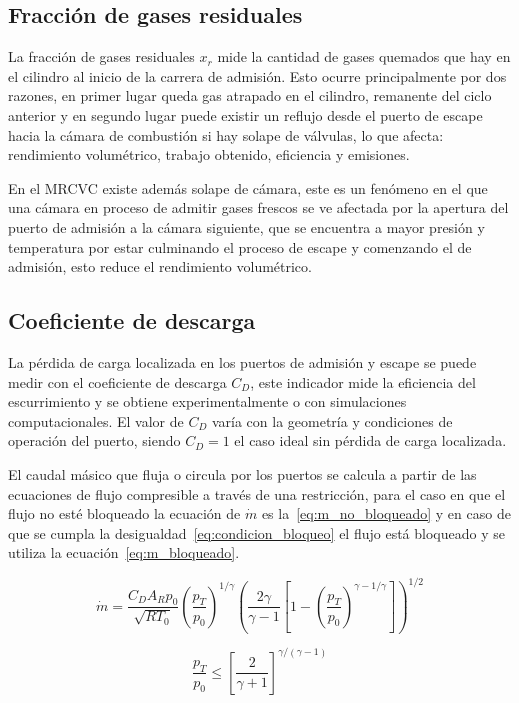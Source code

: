 \subsection{Fracción de gases residuales}
%
La fracción de gases residuales $x_r$ mide la cantidad de gases quemados que hay
en el cilindro al inicio de la carrera de admisión.
%
Esto ocurre principalmente por dos razones, en primer lugar queda gas atrapado
en el cilindro, remanente del ciclo anterior y en segundo lugar puede existir un
reflujo desde el puerto de escape hacia la cámara de combustión si hay solape de
válvulas, lo que afecta: rendimiento volumétrico, trabajo obtenido, eficiencia y
emisiones.

En el MRCVC existe además solape de cámara, este es un fenómeno en el que una
cámara en proceso de admitir gases frescos se ve afectada por la apertura del
puerto de admisión a la cámara siguiente, que se encuentra a mayor presión y
temperatura por estar culminando el proceso de escape y comenzando el de
admisión, esto reduce el rendimiento volumétrico.
%
%
\subsection{Coeficiente de descarga}
%
La pérdida de carga localizada en los puertos de admisión y escape se puede
medir con el coeficiente de descarga $C_{D}$, este indicador mide la eficiencia
del escurrimiento y se obtiene experimentalmente o con simulaciones
computacionales.
%
El valor de $C_{D}$ varía con la geometría y condiciones de operación del
puerto, siendo $C_{D}=1$ el caso ideal sin pérdida de carga localizada.

El caudal másico que fluja o circula por los puertos se calcula a partir de las
ecuaciones de flujo compresible a través de una restricción, para el caso en que
el flujo no esté bloqueado la ecuación de $\dot{m}$ es
la~\ref{eq:m_no_bloqueado} y en caso de que se cumpla la
desigualdad~\ref{eq:condicion_bloqueo} el flujo está bloqueado y se utiliza la
ecuación~\ref{eq:m_bloqueado}.
%

\begin{equation}\label{eq:m_no_bloqueado} \dot{m} = \frac{C_D A_R p_0}{\sqrt{R T_0}} {\left(\frac{p_T}{p_0} \right)}^{1/\gamma} {\left( \frac{2\gamma}{\gamma-1} \left[1- {(\frac{p_T}{p_0})}^{{\gamma-1}/\gamma} \right] \right)}^{1/2}
\end{equation}

\begin{equation}\label{eq:condicion_bloqueo} \frac{p_T}{p_0} \le {[\frac{2}{\gamma+1}]}^{\gamma/(\gamma - 1)}
\end{equation}

